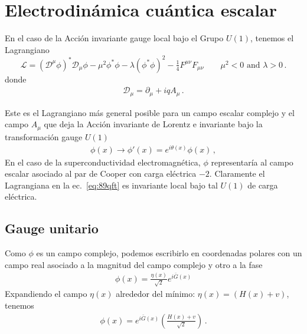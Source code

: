 \section{Electrodinámica cuántica escalar}


\begin{frame}
En el caso de la Acción invariante gauge local bajo el Grupo $U(1)$, tenemos el Lagrangiano 
\begin{equation}
  \label{eq:89qft}
  \mathcal{L}=\left(\mathcal{D}^\mu\phi\right)^*\mathcal{D}_\mu\phi-\mu^2\phi^*\phi-\lambda\left(\phi^*\phi\right)^2-\tfrac{1}{4}F^{\mu\nu}F_{\mu\nu}
  \qquad 
  \mu^2\lt 0\text{ and } \lambda\gt 0\,.
\end{equation}
donde
\begin{align}
  \mathcal{D}_{\mu}=\partial_{\mu}+iq A_{\mu}\,.
\end{align}

Este es el Lagrangiano más general posible para un campo escalar complejo y el campo $A_\mu$ que deja la Acción invariante de Lorentz e invariante bajo la transformación gauge $U(1)$
\begin{align}
\label{eq:sqedgu}
  \phi(x)\to \phi'(x)=e^{i\theta(x)} \phi(x)\,,
\end{align}
En el caso de la superconductividad  electromagnética, $\phi$ representaría al campo escalar asociado al par de Cooper con carga eléctrica $-2$. Claramente el Lagrangiana en la ec.~\eqref{eq:89qft} es invariante local bajo tal $U(1)$ de carga eléctrica. 


\subsection{Gauge unitario}
Como $\phi$ es un campo complejo, podemos escribirlo en coordenadas polares con un campo real asociado a la magnitud del campo complejo y otro a la fase
\begin{align*}
  \phi(x)=\frac{\eta(x)}{\sqrt{2}}e^{i\bar{G}(x)}
\end{align*}
Expandiendo el campo $\eta(x)$ alrededor del mínimo: $\eta(x)=(H(x)+v)$, tenemos
\begin{align*}
    \phi(x)=e^{i\bar{G}(x)}\left(\frac{H(x)+v}{\sqrt{2}}\right)\,.
\end{align*}



\end{frame}
